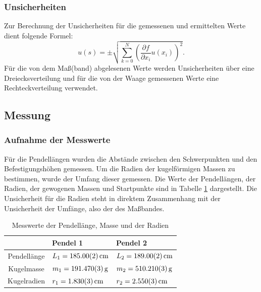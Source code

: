 		\subsubsection{Unsicherheiten}
		
			Zur Berechnung der Unsicherheiten für die gemessenen und ermittelten Werte dient folgende Formel: 
			\begin{equation*}
				u(s) = \pm \sqrt{\sum_{k=0}^{N}\left( \frac{\partial f}{\partial x_i}u(x_i)\right) ^2}. \label{eq:kombUnsicherheit}
			\end{equation*}
			Für die von dem Maß(band) abgelesenen Werte werden Unsicherheiten über eine Dreiecksverteilung und für die von der Waage gemessenen Werte eine Rechteckverteilung verwendet. 
	
	\subsection{Messung}
	
		\subsubsection{Aufnahme der Messwerte}
		
			Für die Pendellängen wurden die Abstände zwischen den Schwerpunkten und den Befestigungshöhen gemessen. 
			Um die Radien der kugelförmigen Massen zu bestimmen, wurde der Umfang dieser gemessen. Die Werte der Pendellängen, der Radien, der gewogenen Massen und Startpunkte sind in Tabelle \ref{tab:Messwerte} dargestellt. Die Unsicherheit für die Radien steht in direktem Zusammenhang mit der Unsicherheit der Umfänge, also der des Maßbandes.
			\begin{table}[ht]
				\caption{Messwerte der Pendellänge, Masse und der Radien}
				\centering
				\label{tab:Messwerte}
				\begin{tabular}{c|l|l}
					{} & {Pendel 1} & {Pendel 2}	\\
					\hline
					{Pendellänge} & {$L_1 = \SI{185+-0,02}{\cm}$} & {$L_2 = \SI{189+-0,02}{\cm}$}	\\
					\hline
					{Kugelmasse} & {$m_1 = \SI{191,47+-0,003}{\g}$} & {$m_2 = \SI{510,21+-0,003}{\g}$}	\\	
					\hline
					{Kugelradien} & {$r_1 = \SI{1,83+-0,003}{\cm}$} & {$r_2 = \SI{2,55+-0,003}{\cm}$}	\\
							
				\end{tabular}
			\end{table}
			
